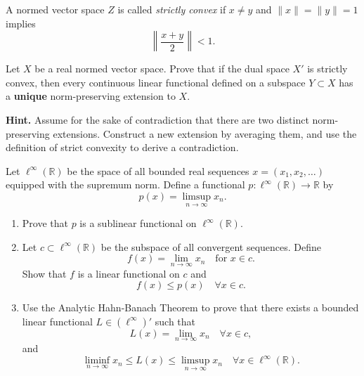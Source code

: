 \documentclass{article}
\begin{document}
\begin{problem}
A normed vector space $Z$ is called \textit{strictly convex} if $x \ne y$ and $\|x\| = \|y\| = 1$ implies
\[ \left\| \frac{x+y}{2} \right\| < 1. \]

Let $X$ be a real normed vector space. Prove that if the dual space $X'$ is strictly convex, then every continuous linear functional defined on a subspace $Y \subset X$ has a \textbf{unique} norm-preserving extension to $X$.

\noindent \textbf{Hint.} Assume for the sake of contradiction that there are two distinct norm-preserving extensions. Construct a new extension by averaging them, and use the definition of strict convexity to derive a contradiction.
\end{problem}

\begin{problem}
Let $\ell^\infty(\mathbb{R})$ be the space of all bounded real sequences $x = (x_1, x_2, \dots)$ equipped with the supremum norm. Define a functional $p: \ell^\infty(\mathbb{R}) \to \mathbb{R}$ by
\[ p(x) = \limsup_{n \to \infty} x_n. \]
\begin{enumerate}
    \item[(i)] Prove that $p$ is a sublinear functional on $\ell^\infty(\mathbb{R})$.
    \item[(ii)] Let $c \subset \ell^\infty(\mathbb{R})$ be the subspace of all convergent sequences. Define
          \[ f(x) = \lim_{n \to \infty} x_n \quad \text{for } x \in c. \]
          Show that $f$ is a linear functional on $c$ and
          \[ f(x) \le p(x) \quad \forall x \in c. \]
    \item[(iii)] Use the Analytic Hahn-Banach Theorem to prove that there exists a bounded linear functional $L \in (\ell^\infty)'$ such that
          \[ L(x) = \lim_{n \to \infty} x_n \quad \forall x \in c, \]
          and
          \[ \liminf_{n \to \infty} x_n \le L(x) \le \limsup_{n \to \infty} x_n \quad \forall x \in \ell^\infty(\mathbb{R}). \]
\end{enumerate}
\end{problem}
\vspace{0.5cm}
\end{document}

